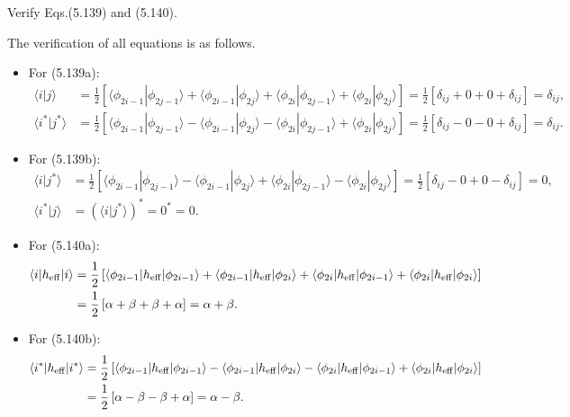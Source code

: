 \documentclass[a4paper]{book}
\newcounter{exercise}[chapter]
\newcounter{solution}[chapter]
\newcommand{\heff}{h_{\rm eff}}
\begin{document}
	\begin{exercise}
	Verify Eqs.(5.139) and (5.140).
	\end{exercise}
	
	\begin{solution}
	
	The verification of all equations is as follows.
	\begin{itemize}
	
	\item For (5.139a):
	\begin{align*}
		\langle i | j \rangle &= \frac{1}{2} \left[ \langle \phi_{2i-1} | \phi_{2j-1} \rangle + \langle \phi_{2i-1} | \phi_{2j} \rangle + \langle \phi_{2i} | \phi_{2j-1} \rangle + \langle \phi_{2i} | \phi_{2j} \rangle \right] = \frac{1}{2} \left[ \delta_{ij} + 0 + 0 + \delta_{ij} \right] = \delta_{ij}, \\
		\langle i^* | j^* \rangle &= \frac{1}{2} \left[ \langle \phi_{2i-1} | \phi_{2j-1} \rangle - \langle \phi_{2i-1} | \phi_{2j} \rangle - \langle \phi_{2i} | \phi_{2j-1} \rangle + \langle \phi_{2i} | \phi_{2j} \rangle \right] = \frac{1}{2} \left[ \delta_{ij} - 0 - 0 + \delta_{ij} \right] = \delta_{ij}.
	\end{align*}
	
	\item For (5.139b):
	\begin{align*}
		\langle i | j^* \rangle &= \frac{1}{2} \left[ \langle \phi_{2i-1} | \phi_{2j-1} \rangle - \langle \phi_{2i-1} | \phi_{2j} \rangle + \langle \phi_{2i} | \phi_{2j-1} \rangle - \langle \phi_{2i} | \phi_{2j} \rangle \right] = \frac{1}{2} \left[ \delta_{ij} - 0 + 0 - \delta_{ij} \right] = 0,  \\
		\langle i^* | j \rangle &= ( \langle i | j^* \rangle )^* = 0^* = 0 .
	\end{align*}
	
	\item For (5.140a):
	\begin{align*}
		\langle i | \heff | i \rangle &= \frac{1}{2} \left[ \langle \phi_{2i-1} | \heff | \phi_{2i-1} \rangle + \langle \phi_{2i-1} | \heff | \phi_{2i} \rangle + \langle \phi_{2i} | \heff | \phi_{2i-1} \rangle + \langle \phi_{2i} | \heff | \phi_{2i} \rangle \right] \\
		&= \frac{1}{2} \left[ \alpha + \beta + \beta + \alpha \right] = \alpha + \beta .
	\end{align*}
	
	\item For (5.140b):
	\begin{align*}
		\langle i^* | \heff | i^* \rangle &= \frac{1}{2} \left[ \langle \phi_{2i-1} | \heff | \phi_{2i-1} \rangle - \langle \phi_{2i-1} | \heff | \phi_{2i} \rangle - \langle \phi_{2i} | \heff | \phi_{2i-1} \rangle + \langle \phi_{2i} | \heff | \phi_{2i} \rangle \right] \\
		&= \frac{1}{2} \left[ \alpha - \beta - \beta + \alpha \right] = \alpha - \beta .
	\end{align*}			
	

\end{itemize}
\end{solution}
\end{document}
